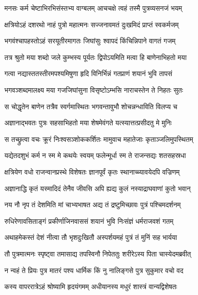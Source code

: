 \twolineshloka
{मनसः कर्म चेष्टाभिरभिसंस्तभ्य वाग्बलम्}
{आचचक्षे त्वहं तस्मै पुत्रव्यसनजं भयम्} %

\twolineshloka
{क्षत्रियोऽहं दशरथो नाहं पुत्रो महात्मनः}
{सज्जनावमतं दुःखमिदं प्राप्तं स्वकर्मजम्} %

\twolineshloka
{भगवंश्चापहस्तोऽहं सरयूतीरमागतः}
{जिघांसुः श्वापदं किंचिन्निपाने वागतं गजम्} %

\twolineshloka
{तत्र श्रुतो मया शब्दो जले कुम्भस्य पूर्यतः}
{द्विपोऽयमिति मत्वा हि बाणेनाभिहतो मया} %

\twolineshloka
{गत्वा नद्यास्ततस्तीरमपश्यमिषुणा हृदि}
{विनिर्भिन्नं गतप्राणं शयानं भुवि तापसं} %

\twolineshloka
{भगवञ्शब्दमालक्ष्य मया गजजिघांसुना}
{विसृष्टोऽम्भसि नाराचस्तेन ते निहतः सुतः} %

\twolineshloka
{स चोद्धृतेन बाणेन तत्रैव स्वर्गमास्थितः}
{भगवन्तावुभौ शोचन्नन्धाविति विलप्य च} %

\twolineshloka
{अज्ञानाद्भवतः पुत्रः सहसाभिहतो मया}
{शेषमेवंगते यत्स्यात्तत्प्रसीदतु मे मुनिः} %

\twolineshloka
{स तच्छ्रुत्वा वचः क्रूरं निःश्वसञ्शोककर्शितः}
{मामुवाच महातेजाः कृताञ्जलिमुपस्थितम्} %

\twolineshloka
{यद्येतदशुभं कर्म न स्म मे कथयेः स्वयम्}
{फलेन्मूर्धा स्म ते राजन्सद्यः शतसहस्रधा} %

\twolineshloka
{क्षत्रियेण वधो राजन्वानप्रस्थे विशेषतः}
{ज्ञानपूर्वं कृतः स्थानाच्च्यावयेदपि वज्रिणम्} %

\twolineshloka
{अज्ञानाद्धि कृतं यस्मादिदं तेनैव जीवसि}
{अपि ह्यद्य कुलं नस्याद्राघवाणां कुतो भवान्} %

\twolineshloka
{नय नौ नृप तं देशमिति मां चाभ्यभाषत}
{अद्य तं द्रष्टुमिच्छावः पुत्रं पश्चिमदर्शनम्} %

\twolineshloka
{रुधिरेणावसिताङ्गं प्रकीर्णाजिनवाससं}
{शयानं भुवि निःसंज्ञं धर्मराजवशं गतम्} %

\twolineshloka
{अथाहमेकस्तं देशं नीत्वा तौ भृशदुःखितौ}
{अस्पर्शयमहं पुत्रं तं मुनिं सह भार्यया} %

\twolineshloka
{तौ पुत्रमात्मनः स्पृष्ट्वा तमासाद्य तपस्विनौ}
{निपेततुः शरीरेऽस्य पिता चास्येदमब्रवीत्} %

\twolineshloka
{न न्वहं ते प्रियः पुत्र मातरं पश्य धार्मिक}
{किं नु नालिङ्गसे पुत्र सुकुमार वचो वद} %

\twolineshloka
{कस्य वापररात्रेऽहं श्रोष्यामि हृदयंगमम्}
{अधीयानस्य मधुरं शास्त्रं वान्यद्विशेषतः} %

